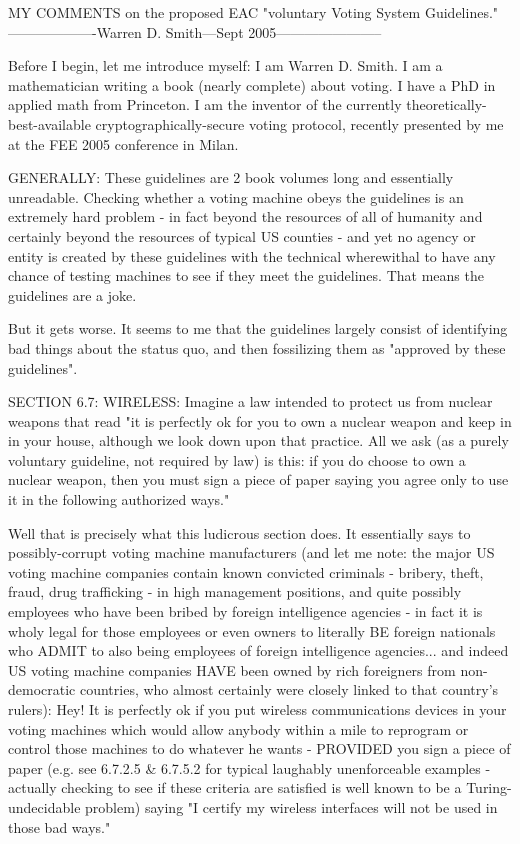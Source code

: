 MY COMMENTS on the proposed EAC "voluntary Voting System Guidelines."
-------------------Warren D. Smith---Sept 2005-----------------------

Before I begin, let me introduce myself: I am Warren D. Smith.  I am a
mathematician writing a book (nearly complete) about voting.  I have a PhD in
applied math from Princeton.  I am the inventor of the currently
theoretically-best-available cryptographically-secure voting protocol,
recently presented by me at the FEE 2005 conference in Milan.

GENERALLY:
These guidelines are 2 book volumes long and essentially unreadable.
Checking whether a voting machine obeys the guidelines is an extremely
hard problem - in fact beyond the resources of all of humanity and certainly
beyond the resources of typical US counties - and yet no agency or
entity is created by these guidelines with the technical wherewithal to have 
any chance of testing machines to see if they meet the guidelines.  That
means the guidelines are a joke.

But it gets worse. It seems to me that the guidelines largely consist of 
identifying bad things about the status quo, and then fossilizing them
as "approved by these guidelines".


SECTION 6.7: WIRELESS:
Imagine a law intended to protect us from nuclear weapons that read "it
is perfectly ok for you to own a nuclear weapon and keep in in your house, although we
look down upon that practice.  All we ask (as a purely voluntary guideline,
not required by law) is this: if you do choose to own a nuclear weapon,
then you must sign a piece of paper saying you agree only to use it in the
following authorized ways."

Well that is precisely what this ludicrous section does.  It essentially
says to possibly-corrupt voting machine manufacturers 
  (and let me note: the major US voting machine 
  companies contain known convicted criminals - bribery, theft, fraud,
  drug trafficking -
  in high management positions, and quite possibly employees who have
  been bribed 
  by foreign intelligence agencies - in fact it is wholy legal for those 
  employees or even owners to literally BE foreign nationals who ADMIT
  to also being employees of foreign intelligence agencies... and
  indeed US voting machine companies HAVE been owned by
  rich foreigners from non-democratic countries, who almost certainly were 
  closely linked to that country's rulers): 
Hey!  It is perfectly ok if you put wireless communications
devices in your voting machines which would allow anybody within a mile
to reprogram or control those machines to do whatever he wants - PROVIDED you sign a
piece of paper (e.g. see 6.7.2.5 & 6.7.5.2  for typical laughably
unenforceable examples - actually checking
to see if these criteria are satisfied is well known to be a
Turing-undecidable problem) saying "I certify my wireless interfaces will not 
be used in those bad ways."

